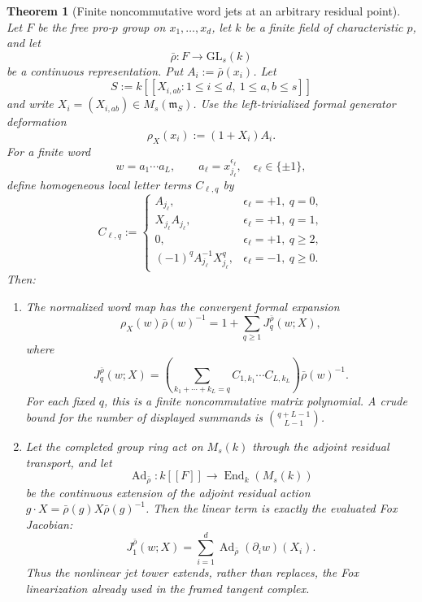 \documentclass[11pt]{article}
\newtheorem{theorem}{Theorem}[section]
\theoremstyle{definition}
\begin{document}
\begin{theorem}[Finite noncommutative word jets at an arbitrary residual point]\label{thm:arbitrary-residual-word-jets}
Let $F$ be the free pro-$p$ group on $x_1,\ldots,x_d$, let $k$ be a finite
field of characteristic $p$, and let
\[
 \bar\rho:F\longrightarrow \mathrm{GL}_s(k)
\]
be a continuous representation.  Put $A_i:=\bar\rho(x_i)$.  Let
\[
 S:=k[[X_{i,ab}:1\le i\le d,\ 1\le a,b\le s]]
\]
and write $X_i=(X_{i,ab})\in M_s(\mathfrak m_S)$.  Use the left-trivialized
formal generator deformation
\begin{equation}\label{eq:left-trivialized-generator-deformation}
 \rho_X(x_i):=(1+X_i)A_i.
\end{equation}
For a finite word
\[
 w=a_1\cdots a_L,
 \qquad
 a_\ell=x_{j_\ell}^{\epsilon_\ell},\quad \epsilon_\ell\in\{\pm1\},
\]
define homogeneous local letter terms $C_{\ell,q}$ by
\begin{equation}\label{eq:letter-jet-coefficients}
 C_{\ell,q}:=
 \begin{cases}
 A_{j_\ell},&\epsilon_\ell=+1,\ q=0,\\
 X_{j_\ell}A_{j_\ell},&\epsilon_\ell=+1,\ q=1,\\
 0,&\epsilon_\ell=+1,\ q\ge2,\\
 (-1)^qA_{j_\ell}^{-1}X_{j_\ell}^{q},
   &\epsilon_\ell=-1,\ q\ge0.
 \end{cases}
\end{equation}
Then:
\begin{enumerate}[label=\textnormal{(\roman*)}]
\item The normalized word map has the convergent formal expansion
\begin{equation}\label{eq:arbitrary-residual-word-jet-expansion}
 \rho_X(w)\bar\rho(w)^{-1}
 =1+\sum_{q\ge1}J_q^{\bar\rho}(w;X),
\end{equation}
where
\begin{equation}\label{eq:arbitrary-residual-word-jet}
 J_q^{\bar\rho}(w;X)
 =
 \left(
 \sum_{k_1+\cdots+k_L=q}
 C_{1,k_1}\cdots C_{L,k_L}
 \right)\bar\rho(w)^{-1}.
\end{equation}
For each fixed $q$, this is a finite noncommutative matrix polynomial.  A
crude bound for the number of displayed summands is
$\binom{q+L-1}{L-1}$.

\item Let the completed group ring act on $M_s(k)$ through the adjoint residual
transport, and let
\[
 \operatorname{Ad}_{\bar\rho}:k[[F]]
 \longrightarrow \operatorname{End}_k(M_s(k))
\]
be the continuous extension of the adjoint residual action
$g\cdot X=\bar\rho(g)X\bar\rho(g)^{-1}$.  Then the linear term is exactly
the evaluated Fox Jacobian:
\begin{equation}\label{eq:word-jet-linear-fox}
 J_1^{\bar\rho}(w;X)
 =\sum_{i=1}^{d}
 \operatorname{Ad}_{\bar\rho}(\partial_i w)(X_i).
\end{equation}
Thus the nonlinear jet tower extends, rather than replaces, the Fox
linearization already used in the framed tangent complex.


\end{enumerate}
\end{theorem}
\end{document}
